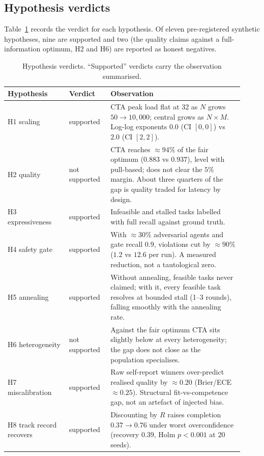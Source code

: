\documentclass[11pt]{article}
\begin{document}
\subsection{Hypothesis verdicts}
Table~\ref{tab:verdicts} records the verdict for each hypothesis. Of eleven pre-registered synthetic hypotheses, nine are supported and two (the quality claims against a full-information optimum, H2 and H6) are reported as honest negatives.

\begin{table}[t]
\centering\small
\caption{Hypothesis verdicts. ``Supported'' verdicts carry the observation summarised.}
\label{tab:verdicts}
\begin{tabular}{@{}p{0.24\linewidth}p{0.16\linewidth}p{0.52\linewidth}@{}}
\toprule
\textbf{Hypothesis} & \textbf{Verdict} & \textbf{Observation} \\
\midrule
H1 scaling & supported & CTA peak load flat at 32 as $N$ grows $50\to10{,}000$; central grows as $N\times M$. Log-log exponents $0.0$ (CI $[0,0]$) vs $2.0$ (CI $[2,2]$). \\
H2 quality & not supported & CTA reaches $\approx 94\%$ of the fair optimum ($0.883$ vs $0.937$), level with pull-based; does not clear the $5\%$ margin. About three quarters of the gap is quality traded for latency by design. \\
H3 expressiveness & supported & Infeasible and stalled tasks labelled with full recall against ground truth. \\
H4 safety gate & supported & With $\approx 30\%$ adversarial agents and gate recall $0.9$, violations cut by $\approx 90\%$ ($1.2$ vs $12.6$ per run). A measured reduction, not a tautological zero. \\
H5 annealing & supported & Without annealing, feasible tasks never claimed; with it, every feasible task resolves at bounded stall (1--3 rounds), falling smoothly with the annealing rate. \\
H6 heterogeneity & not supported & Against the fair optimum CTA sits slightly below at every heterogeneity; the gap does not close as the population specialises. \\
H7 miscalibration & supported & Raw self-report winners over-predict realised quality by $\approx 0.20$ (Brier/ECE $\approx 0.25$). Structural fit-vs-competence gap, not an artefact of injected bias. \\
H8 track record recovers & supported & Discounting by $R$ raises completion $0.37\to0.76$ under worst overconfidence (recovery $0.39$, Holm $p<0.001$ at 20 seeds). \\

\end{tabular}
\end{table}
\end{document}
